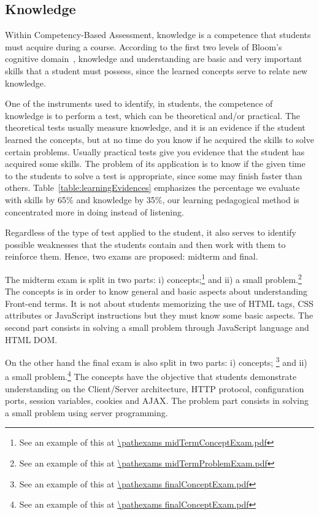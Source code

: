 \subsection{Knowledge}
Within Competency-Based Assessment, knowledge is a competence that students must acquire during 
a course. According to the first two levels of Bloom's cognitive domain~\cite{BloomTaxonomy2001}, 
knowledge and understanding are basic and very important skills that a student must possess, 
since the learned concepts serve to relate new knowledge.

One of the instruments used to identify, in students, the competence of knowledge is to perform a 
test, which can be theoretical and/or practical. 
The theoretical tests usually measure knowledge, and it is an evidence if the student learned the concepts, 
but at no time do you know if he acquired the skills to solve certain problems.
Usually practical tests give you evidence that the student has acquired some skills. The problem of 
its application is to know if the given time to the students to solve a test is appropriate, since 
some may finish faster than others.  Table~\ref{table:learningEvidences} emphasizes the percentage we 
evaluate with skills by 65\% and knowledge by 35\%, our learning pedagogical method is 
concentrated more in doing instead of listening.


Regardless of the type of test applied to the student, it also serves to identify possible weaknesses 
that the students contain and then work with them to reinforce them. Hence, two exams are proposed: 
midterm and final.

The midterm exam is split in two parts:
i) concepts;\footnote{See an example of this at \url{\pathexams midTermConceptExam.pdf}} and 
ii) a small problem.\footnote{See an example of this at \url{\pathexams midTermProblemExam.pdf}} 
The concepts is in order to know general and basic aspects about understanding Front-end terms. 
It is not about students memorizing the use of HTML tags, CSS attributes or JavaScript instructions 
but they must know some basic aspects. The second part consists in solving a small problem through 
JavaScript language and HTML DOM.

On the other hand the final exam is also split in two parts: 
i) concepts; \footnote{See an example of this at \url{\pathexams finalConceptExam.pdf}} and 
ii) a small problem.\footnote{See an example of this at \url{\pathexams finalConceptExam.pdf}} 
The concepts have the objective that students demonstrate understanding on the Client/Server 
architecture, HTTP protocol, configuration ports, session variables, cookies and AJAX. 
The problem part consists in solving a small problem using server programming.

